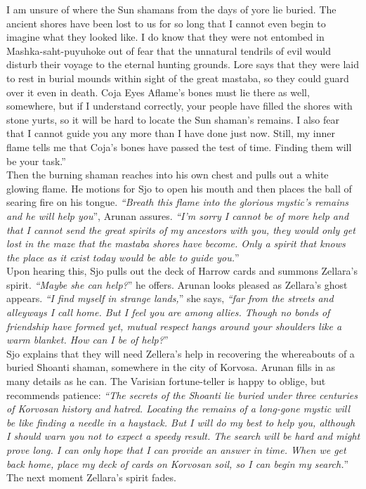 {I am unsure of where the Sun shamans from the days of yore lie buried. The ancient shores have been lost to us for so long that I cannot even begin to imagine what they looked like. I do know that they were not entombed in Mashka-saht-puyuhoke out of fear that the unnatural tendrils of evil would disturb their voyage to the eternal hunting grounds. Lore says that they were laid to rest in burial mounds within sight of the great mastaba, so they could guard over it even in death. Coja Eyes Aflame's bones must lie there as well, somewhere, but if I understand correctly, your people have filled the shores with stone yurts, so it will be hard to locate the Sun shaman's remains. I also fear that I cannot guide you any more than I have done just now. Still, my inner flame tells me that Coja's bones have passed the test of time. Finding them will be your task.}''\\

Then the burning shaman reaches into his own chest and pulls out a white glowing flame. He motions for Sjo to open his mouth and then places the ball of searing fire on his tongue. {\itshape``Breath this flame into the glorious mystic's remains and he will help you}'', Arunan assures. {\itshape``I'm sorry I cannot be of more help and that I cannot send the great spirits of my ancestors with you, they would only get lost in the maze that the mastaba shores have become. Only a spirit that knows the place as it exist today would be able to guide you.}''\\

Upon hearing this, Sjo pulls out the deck of Harrow cards and summons Zellara's spirit. {\itshape``Maybe she can help?}'' he offers. Arunan looks pleased as Zellara's ghost appears. {\itshape``I find myself in strange lands,}'' she says, {\itshape``far from the streets and alleyways I call home. But I feel you are among allies. Though no bonds of friendship have formed yet, mutual respect hangs around your shoulders like a warm blanket. How can I be of help?}''\\

Sjo explains that they will need Zellera's help in recovering the whereabouts of a buried Shoanti shaman, somewhere in the city of Korvosa. Arunan fills in as many details as he can. The Varisian fortune-teller is happy to oblige, but recommends patience: {\itshape``The secrets of the Shoanti lie buried under three centuries of Korvosan history and hatred. Locating the remains of a long-gone mystic will be like finding a needle in a haystack. But I will do my best to help you, although I should warn you not to expect a speedy result. The search will be hard and might prove long. I can only hope that I can provide an answer in time. When we get back home, place my deck of cards on Korvosan soil, so I can begin my search.}'' The next moment Zellara's spirit fades.\\

